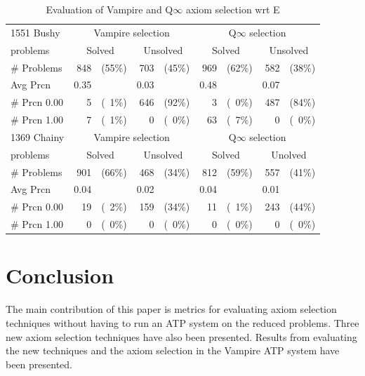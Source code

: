 \documentclass[EPiC]{easychair}
\begin{document}
\begin{table}[hbt]
\begin{center}
\begin{tabular}{|l|rr|rr|rr|rr|}
\hline
1551 Bushy      & \multicolumn{4}{|c|}{Vampire selection} & \multicolumn{4}{|c|}{Q$\infty$ selection} \\
problems        & \multicolumn{2}{|c|}{Solved} & \multicolumn{2}{|c|}{Unsolved} & \multicolumn{2}{|c|}{Solved} & \multicolumn{2}{|c|}{Unsolved} \\
\hline
\# Problems     &  848 & (55\%) &  703 & (45\%) &  969 & (62\%) &  582 & (38\%) \\
Avg Prcn        & 0.35 &        & 0.03 &        & 0.48 &        & 0.07 &        \\
\# Prcn 0.00    &    5 & (~1\%) &  646 & (92\%) &    3 & (~0\%) &  487 & (84\%) \\
\# Prcn 1.00    &    7 & (~1\%) &    0 & (~0\%) &   63 & (~7\%) &    0 & (~0\%) \\
\hline
\hline
1369 Chainy     & \multicolumn{4}{|c|}{Vampire selection} & \multicolumn{4}{|c|}{Q$\infty$ selection} \\
problems        & \multicolumn{2}{|c|}{Solved} & \multicolumn{2}{|c|}{Unsolved} & \multicolumn{2}{|c|}{Solved} & \multicolumn{2}{|c|}{Unolved} \\
\hline
\# Problems     &  901 & (66\%) &  468 & (34\%) &  812 & (59\%) &  557 & (41\%) \\
Avg Prcn        & 0.04 &        & 0.02 &        & 0.04 &        & 0.01 &        \\
\# Prcn 0.00    &   19 & (~2\%) &  159 & (34\%) &   11 & (~1\%) &  243 & (44\%) \\
\# Prcn 1.00    &    0 & (~0\%) &    0 & (~0\%) &    0 & (~0\%) &    0 & (~0\%) \\
\hline
\end{tabular}
\caption{Evaluation of Vampire and Q$\infty$ axiom selection wrt E}
\label{EvaluationOfMetrics}
\end{center}
\end{table}

\section{Conclusion}
\label{Conclusion}

The main contribution of this paper is metrics for evaluating axiom selection 
techniques without having to run an ATP system on the reduced problems.
Three new axiom selection techniques have also been presented.
Results from evaluating the new techniques and the axiom selection in the 
Vampire ATP system have been presented.
\end{document}
